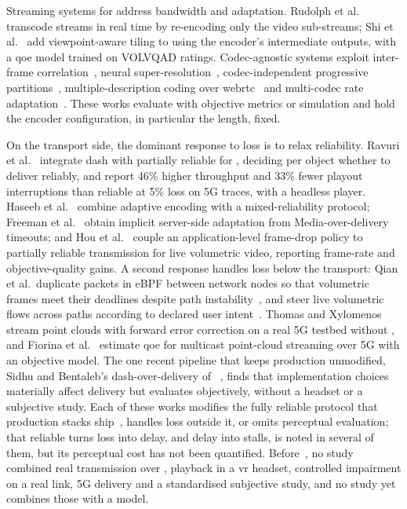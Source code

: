 Streaming systems for \vpcc address bandwidth and adaptation. Rudolph
et al.~\cite{rudolph2025rabbit} transcode \vpcc streams in real time by
re-encoding only the video sub-streams; Shi et al.~\cite{qv424} add
viewpoint-aware tiling to \vpcc using the encoder's intermediate
outputs, with a \gls{qoe} model trained on VOLVQAD ratings.
Codec-agnostic systems exploit inter-frame correlation~\cite{hermes},
neural super-resolution~\cite{yuzu}, codec-independent progressive
partitions~\cite{p2vs}, multiple-description coding over
\gls{webrtc}~\cite{mathias24} and multi-codec rate
adaptation~\cite{codec}. These works evaluate with objective metrics or
simulation and hold the encoder configuration, in particular the \gof
length, fixed.

On the transport side, the dominant response to loss is to relax
reliability. Ravuri et al.~\cite{ravuri2023} integrate \gls{dash} with
partially reliable \quic for \vpcc, deciding per object whether to
deliver reliably, and report 46\% higher throughput and 33\% fewer
playout interruptions than reliable \quic at 5\% loss on 5G traces,
with a headless player. Haseeb et al.~\cite{haseeb2025} combine
adaptive encoding with a mixed-reliability \quic protocol; Freeman et
al.~\cite{moq2025} obtain implicit server-side adaptation from
Media-over-\quic delivery timeouts; and Hou et al.~\cite{hou2026cetus}
couple an application-level frame-drop policy to partially reliable
transmission for live volumetric video, reporting frame-rate and
objective-quality gains. A second response handles loss below the
transport: Qian et al.\ duplicate packets in eBPF between network nodes
so that volumetric frames meet their deadlines despite path
instability~\cite{qian2024ebpf}, and steer live volumetric flows across
paths according to declared user intent~\cite{qian2024intent}. Thomas
and Xylomenos~\cite{thomas2025} stream point clouds with forward error
correction on a real 5G testbed without \quic, and Fiorina et
al.~\cite{fiorina2025} estimate \gls{qoe} for multicast point-cloud
streaming over 5G with an objective model. The one recent pipeline
that keeps production \quic unmodified, Sidhu and Bentaleb's
\gls{dash}-over-\quic delivery of \gpcc~\cite{gpcc2026quic}, finds that
\quic implementation choices materially affect delivery but evaluates
objectively, without a headset or a subjective study. Each of these
works modifies the fully reliable protocol that production stacks
ship~\cite{rfc9000}, handles loss outside it, or omits perceptual
evaluation; that reliable \quic turns loss into delay, and delay into
\gof stalls, is noted in several of them, but its perceptual cost has
not been quantified. Before~\cite{mosaic2026}, no study combined real
\vpcc transmission over \quic, playback in a \gls{vr} headset,
controlled impairment on a real link, 5G delivery and a standardised
subjective study, and no study yet combines those with a model.

